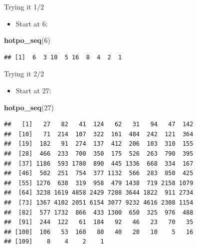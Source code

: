 \documentclass[
  ignorenonframetext,
]{beamer}
\newenvironment{Shaded}{\begin{snugshade}}{\end{snugshade}}
\newcommand{\DecValTok}[1]{\textcolor[rgb]{0.00,0.00,0.81}{#1}}
\newcommand{\KeywordTok}[1]{\textcolor[rgb]{0.13,0.29,0.53}{\textbf{#1}}}
\newcommand{\NormalTok}[1]{#1}
\providecommand{\tightlist}{%
  \setlength{\itemsep}{0pt}\setlength{\parskip}{0pt}}
\begin{document}
\begin{frame}[fragile]{Trying it 1/2}
\protect\hypertarget{trying-it-12}{}

\begin{itemize}
\tightlist
\item
  Start at 6:
\end{itemize}

\begin{Shaded}
\begin{Highlighting}[]
\KeywordTok{hotpo_seq}\NormalTok{(}\DecValTok{6}\NormalTok{)}
\end{Highlighting}
\end{Shaded}

\begin{verbatim}
## [1]  6  3 10  5 16  8  4  2  1
\end{verbatim}

\end{frame}

\begin{frame}[fragile]{Trying it 2/2}
\protect\hypertarget{trying-it-22}{}

\begin{itemize}
\tightlist
\item
  Start at 27:
\end{itemize}

\footnotesize

\begin{Shaded}
\begin{Highlighting}[]
\KeywordTok{hotpo_seq}\NormalTok{(}\DecValTok{27}\NormalTok{)}
\end{Highlighting}
\end{Shaded}

\begin{verbatim}
##   [1]   27   82   41  124   62   31   94   47  142
##  [10]   71  214  107  322  161  484  242  121  364
##  [19]  182   91  274  137  412  206  103  310  155
##  [28]  466  233  700  350  175  526  263  790  395
##  [37] 1186  593 1780  890  445 1336  668  334  167
##  [46]  502  251  754  377 1132  566  283  850  425
##  [55] 1276  638  319  958  479 1438  719 2158 1079
##  [64] 3238 1619 4858 2429 7288 3644 1822  911 2734
##  [73] 1367 4102 2051 6154 3077 9232 4616 2308 1154
##  [82]  577 1732  866  433 1300  650  325  976  488
##  [91]  244  122   61  184   92   46   23   70   35
## [100]  106   53  160   80   40   20   10    5   16
## [109]    8    4    2    1
\end{verbatim}

\normalsize

\end{frame}
\end{document}
